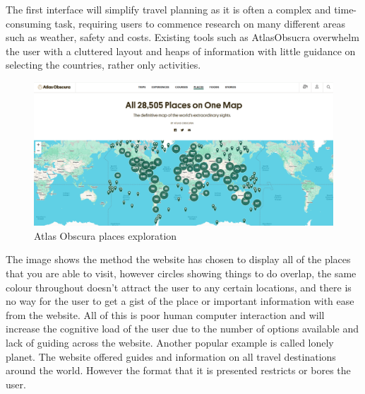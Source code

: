 \documentclass[]{project_interim}
\begin{document}
The first interface will simplify travel planning as it is often a complex and time-consuming task, requiring users to commence research on many different areas such as weather, safety and costs. Existing tools such as AtlasObsucra overwhelm the user with a cluttered layout and heaps of information with little guidance on selecting the countries, rather only activities.

\begin{figure}[ht!]
  \centering
  \includegraphics{atlasObscura.png}
  \vspace*{0.0cm}
  \caption{Atlas Obscura places exploration}
  \label{fig:1}
\end{figure}

The image shows the method the website has chosen to display all of the places that you are able to visit, however circles showing things to do overlap, the same colour throughout doesn’t attract the user to any certain locations, and there is no way for the user to get a gist of the place or important information with ease from the website. All of this is poor human computer interaction and will increase the cognitive load of the user due to the number of options available and lack of guiding across the website.
Another popular example is called lonely planet. The website offered guides and information on all travel destinations around the world. However the format that it is presented restricts or bores the user.

\newpage
\end{document}
